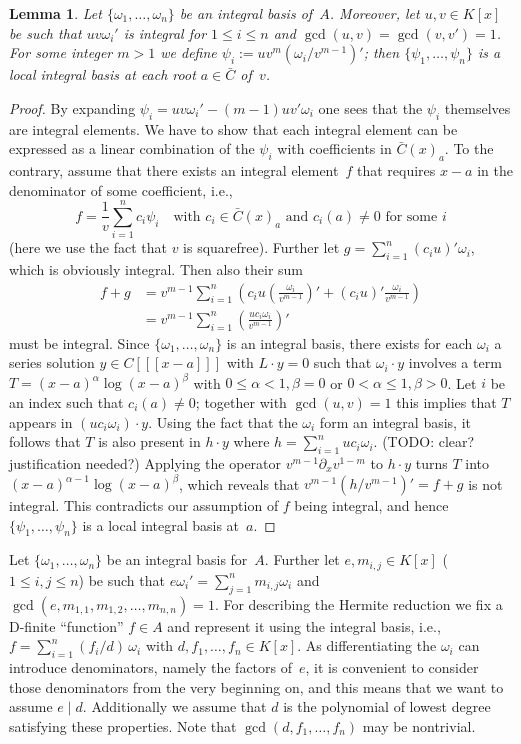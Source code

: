 \documentclass{sig-alternate}
\newtheorem{lemma}[theorem]{Lemma}
\newcommand{\red}{\color{red}}
\begin{document}
\begin{lemma}\label{lemma:ibv}
Let $\{\omega_1,\ldots,\omega_n\}$ be an integral basis of~$A$.
Moreover, let $u,v\in K[x]$ be such that $uv\omega_i'$ is
integral for $1\leq i\leq n$ and $\gcd(u,v)=\gcd(v,v')=1$.  For some integer
$m>1$ we define $\psi_i:=uv^m(\omega_i/v^{m-1})'$; then
$\{\psi_1,\ldots,\psi_n\}$ is a local integral basis at each root $a\in\bar C$ of~$v$.
\end{lemma}
\begin{proof}
By expanding $\psi_i=uv\omega_i'-(m-1)uv'\omega_i$ one sees that the $\psi_i$
themselves are integral elements. We 
have to show that each integral element can be expressed as a linear
combination of the $\psi_i$ with coefficients in $\bar C(x)_a$. To the contrary, 
assume that there exists an integral element~$f$ that requires $x-a$ in the
denominator of some coefficient, i.e.,
\[
  f = \frac{1}{v} \sum_{i=1}^n c_i \psi_i \quad\text{with }c_i\in \bar{C}(x)_a
  \text{ and } c_i(a)\neq0 \text{ for some } i
\]
(here we use the fact that $v$ is squarefree).  Further let $g=\sum_{i=1}^n
(c_iu)'\omega_i$, which is obviously integral. Then also their sum
\begin{align*}
  f+g &= v^{m-1} \sum_{i=1}^n \left(c_iu \left(\frac{\omega_i}{v^{m-1}}\right)'
  + (c_iu)'\frac{\omega_i}{v^{m-1}} \right) \\
  &= v^{m-1} \sum_{i=1}^n \left(\frac{uc_i\omega_i}{v^{m-1}}\right)'
\end{align*}
must be integral. Since $\{\omega_1,\ldots,\omega_n\}$ is an integral basis,
there exists for each $\omega_i$ a series solution $y\in C[[[x-a]]]$ with
$L\cdot y=0$ such that $\omega_i\cdot y$ involves a term
$T=(x-a)^\alpha\log(x-a)^\beta$ with $0\leq\alpha<1,\beta=0$ or
$0<\alpha\leq1,\beta>0$. Let $i$ be an index such that $c_i(a)\neq0$; together
with $\gcd(u,v)=1$ this implies that $T$ appears in $(uc_i\omega_i)\cdot
y$. Using the fact that the $\omega_i$ form an integral basis, it follows that
$T$ is also present in $h\cdot y$ where $h=\sum_{i=1}^n uc_i\omega_i$. {\red
  (TODO: clear?  justification needed?)}  Applying the operator
$v^{m-1}\partial_xv^{1-m}$ to $h\cdot y$ turns $T$ into
$(x-a)^{\alpha-1}\log(x-a)^\beta$, which reveals that
$v^{m-1}(h/v^{m-1})'=f+g$ is not integral. This contradicts our assumption of
$f$ being integral, and hence $\{\psi_1,\ldots,\psi_n\}$ is a local integral
basis at~$a$.
\end{proof}

Let $\{\omega_1,\ldots,\omega_n\}$ be an integral basis for~$A$.
Further let $e,m_{i,j}\in K[x]$ ($1\leq i,j\leq n$) be such that
$e\omega_i'=\sum_{j=1}^n m_{i,j}\omega_i$ and
$\gcd(e,m_{1,1},m_{1,2},\ldots,m_{n,n})=1$. For describing the Hermite
reduction we fix a D-finite ``function'' $f\in A$ and represent it using the
integral basis, i.e., $f=\sum_{i=1}^n (f_i/d)\,\omega_i$ with
$d,f_1,\ldots,f_n\in K[x]$. As differentiating the $\omega_i$ can introduce
denominators, namely the factors of~$e$, it is convenient to consider those
denominators from the very beginning on, and this means that we want to assume
$e\mid d$. Additionally we assume that $d$ is the polynomial of lowest degree
satisfying these properties. %
Note that $\gcd(d,f_1,\ldots,f_n)$ may be nontrivial.
\end{document}
